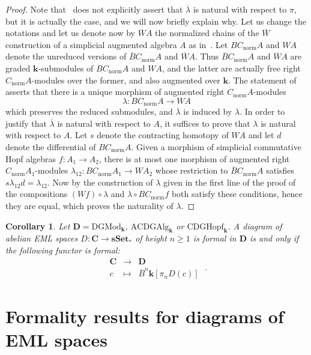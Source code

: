 \documentclass{amsart}
\newtheorem{corollary}[formula]{Corollary}
\theoremstyle{definition}
\theoremstyle{remark}
\renewcommand{\geq}{\geqslant}
\newcommand{\Cc}{\mathbf{C}}
\newcommand{\Dd}{\mathbf{D}}
\newcommand{\sset}{\mathbf{sSet}}
\def\k{\mathbf{k}}
\begin{document}
\begin{proof}
	Note that~\cite[Theorem~A.20]{gu-ma-74} does not explicitly assert that $\overline{\lambda}$ is natural with respect to $\pi$, but it is actually the case, and we will now briefly explain why. Let us change the notations and let us denote now by $\overline{W}A$ the normalized chains of the $\overline{W}$ construction of a simplicial augmented algebra $A$ as in~\cite[Definition~A.14]{gu-ma-74}. Let $BC_{\mathrm{norm}}A$ and $WA$ denote the unreduced versions of $\overline{B}C_{\mathrm{norm}}A$ and $\overline{W}A$. Thus $\overline{B}C_{\mathrm{norm}}A$ and $\overline{W}A$ are graded $\k$-submodules of $BC_{\mathrm{norm}}A$ and $WA$, and the latter are actually free right $C_{\mathrm{norm}}A$-modules over the former, and also augmented over $\k$. The statement of~\cite[Theorem~A.20]{gu-ma-74} asserts that there is a unique morphism of augmented right $C_{\mathrm{norm}}A$-modules 
	$$\lambda: BC_{\mathrm{norm}}A\to WA$$
	which preserves the reduced submodules, and $\overline{\lambda}$ is induced by $\lambda$. In order to justify that $\overline{\lambda}$ is natural with respect to $A$, it suffices to prove that $\lambda$ is natural with respect to $A$. Let $s$ denote the contracting homotopy of $WA$ and let $d$ denote the differential of $BC_{\mathrm{norm}}A$. Given a morphism of simplicial commutative Hopf algebras $f:A_1\to A_2$, there is at most one morphism of augmented right $C_{\mathrm{norm}}A_1$-modules $\lambda_{12}:BC_{\mathrm{norm}}A_1\to WA_2$ whose restriction to $\overline{B}C_{\mathrm{norm}}A$ satisfies $s\lambda_{12}d=\lambda_{12}$. Now by the construction of $\lambda$ given in the first line of the proof of~\cite[Theorem~A.20]{gu-ma-74} the compositions $(Wf)\circ \lambda$ and 
	$\lambda\circ BC_\mathrm{norm}f$ both satisfy these conditions, hence they are equal, which proves the naturality of $\lambda$.
\end{proof}

\begin{corollary}\label{cor:reductiontobar}
	Let $\Dd=\mathrm{DGMod}_\k$, $\mathrm{ACDGAlg}_\k$ or $\mathrm{CDGHopf}_\k$.
	A diagram of abelian EML spaces $D\colon\Cc\to \sset_{*}$ of height $n\geq 1$ is formal in $\Dd$ is and only if the following functor is formal:
	\[
	\begin{array}{ccc}
		\Cc & \to & \Dd \\
		c & \mapsto & \overline{B}^n \k[\pi_nD(c)]
	\end{array} \;.
	\]
\end{corollary}

\section{Formality results for diagrams of EML spaces}\label{sec-formality}
\end{document}
